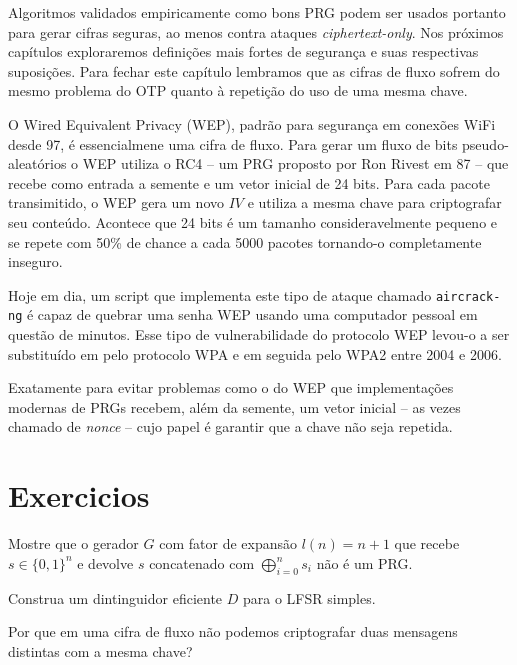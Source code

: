Algoritmos validados empiricamente como bons PRG podem ser usados portanto para gerar cifras seguras, ao menos contra ataques {\em ciphertext-only}.
Nos próximos capítulos exploraremos definições mais fortes de segurança e suas respectivas suposições.
Para fechar este capítulo lembramos que as cifras de fluxo sofrem do mesmo problema do OTP quanto à repetição do uso de uma mesma chave.


\begin{example}
O Wired Equivalent Privacy (WEP), padrão para segurança em conexões WiFi desde 97, é essencialmene uma cifra de fluxo.
Para gerar um fluxo de bits pseudo-aleatórios o WEP utiliza o RC4 -- um PRG proposto por Ron Rivest em 87 -- que recebe como entrada a semente e um vetor inicial de 24 bits.
Para cada pacote transimitido, o WEP gera um novo $IV$ e utiliza a mesma chave para criptografar seu conteúdo.
Acontece que 24 bits é um tamanho consideravelmente pequeno e se repete com 50\% de chance a cada 5000 pacotes tornando-o completamente inseguro.

Hoje em dia, um script que implementa este tipo de ataque chamado {\tt aircrack-ng} é capaz de quebrar uma senha WEP usando uma computador pessoal em questão de minutos.
Esse tipo de vulnerabilidade do protocolo WEP levou-o a ser substituído em pelo protocolo WPA e em seguida pelo WPA2 entre 2004 e 2006.
\end{example}

Exatamente para evitar problemas como o do WEP que implementações modernas de PRGs recebem, além da semente, um vetor inicial -- as vezes chamado de {\em nonce} -- cujo papel é garantir que a chave não seja repetida.

\section{Exercicios}
\label{sec:exercicios}

\begin{exercicio}
Mostre que o gerador $G$ com fator de expansão $l(n) = n + 1$ que recebe $s \in \{0,1\}^n$ e devolve $s$ concatenado com $\bigoplus_{i=0}^ns_i$ não é um PRG.  
\end{exercicio}

\begin{exercicio}
  Construa um dintinguidor eficiente $D$ para o LFSR simples.
\end{exercicio}


\begin{exercicio}
  Por que em uma cifra de fluxo não podemos criptografar duas mensagens distintas com a mesma chave?
\end{exercicio}

